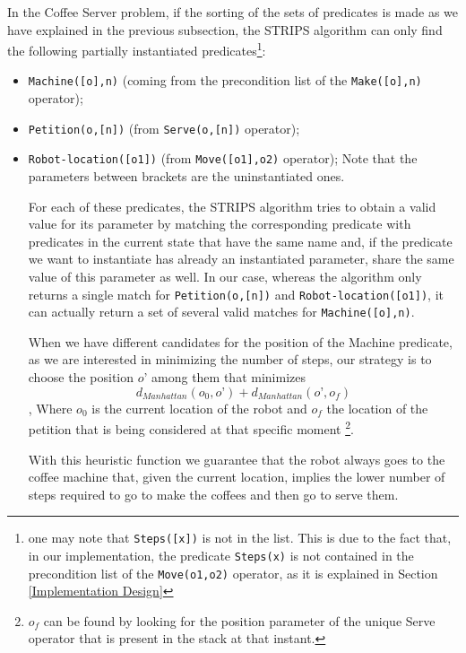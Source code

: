 \documentclass[12pt,a4paper,oneside]{article}
\numberwithin{equation}{section}
\numberwithin{equation}{section}
\theoremstyle{definition}
\begin{document}
In the Coffee Server problem, if the sorting of the sets of predicates is made as we have explained in the previous subsection, the STRIPS algorithm can only find the following partially instantiated predicates\footnote{one may note that \texttt{Steps([x])} is not in the list. This is due to the fact that, in our implementation, the predicate \texttt{Steps(x)} is not contained in the precondition list of the \texttt{Move(o1,o2)} operator, as it is explained in Section \ref{Implementation Design}}:
\begin{itemize}
	\item \texttt{Machine([o],n)} (coming from the precondition list of the \texttt{Make([o],n)} operator);
	\item \texttt{Petition(o,[n])} (from \texttt{Serve(o,[n])} operator);
	\item \texttt{Robot-location([o1])} (from \texttt{Move([o1],o2)} operator);
Note that the parameters between brackets are the uninstantiated ones.


For each of these predicates, the STRIPS algorithm tries to obtain a valid value for its parameter by matching the corresponding predicate with predicates in the current state that have the same name and, if the predicate we want to instantiate has already an instantiated parameter, share the same value of this parameter as well. In our case, whereas the algorithm only returns a single match for \texttt{Petition(o,[n])} and \texttt{Robot-location([o1])}, it can actually return a set of several valid matches for \texttt{Machine([o],n)}. 


When we have different candidates for the position of the Machine predicate, as we are interested in minimizing the number of steps, our strategy is to choose the position $o’$ among them that minimizes
$$d_{Manhattan} (o_0, o’) + d_{Manhattan}(o’, o_f)$$,
Where $o_0$ is the current location of the robot and $o_f$ the location of the petition that is being considered at that specific moment \footnote{$o_f$ can be found by looking for the position parameter of the unique Serve operator that is present in the stack at that instant.}. 


With this heuristic function we guarantee that the robot always goes to the coffee machine that, given the current location, implies the lower number of steps required to go to make the coffees and then go to serve them.

\newpage


\end{itemize}
\end{document}
